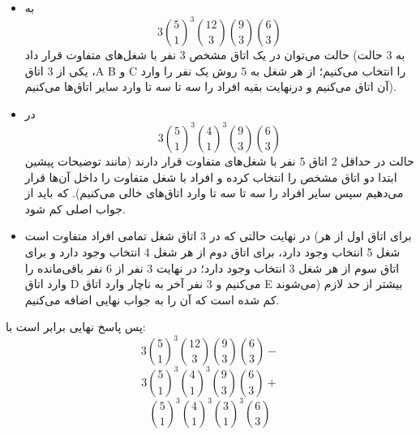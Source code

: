 \p
\begin{itemize}
    \item 
    به
    $$3\binom{5}{1}^3\binom{12}{3}\binom{9}{3}\binom{6}{3}$$
    حالت می‌توان در یک اتاق مشخص 3 نفر با شغل‌های متفاوت قرار داد (به 3 حالت یکی از 3 اتاق  ،A B و C را انتخاب می‌کنیم؛ از هر شغل به 5 روش یک نفر را وارد آن اتاق می‌کنیم و در‌نهایت بقیه افراد را سه تا سه تا وارد سایر اتاق‌ها می‌کنیم).

    \item
    در
    $$3\binom{5}{1}^3\binom{4}{1}^3\binom{9}{3}\binom{6}{3}$$
    حالت در حداقل 2 اتاق 5 نفر با شغل‌های متفاوت قرار دارند (مانند توضیحات پیشین ابتدا دو اتاق مشخص را انتخاب کرده و افراد با شغل متفاوت را داخل آن‌ها قرار می‌دهیم سپس سایر افراد را سه تا سه تا وارد اتاق‌های خالی می‌کنیم). که باید از جواب اصلی کم شود.
    
    \item
    در نهایت حالتی که در 3 اتاق شغل تمامی افراد متفاوت است (برای اتاق اول از هر شغل 5 انتخاب وجود دارد، برای اتاق دوم از هر شغل 4 انتخاب وجود دارد و برای اتاق سوم از هر شغل 3 انتخاب وجود دارد؛ در نهایت 3 نفر از 6 نفر باقی‌مانده را وارد اتاق D می‌کنیم و 3 نفر آخر به ناچار وارد اتاق E می‌شوند) بیشتر از حد لازم کم شده است که آن را به جواب نهایی اضافه می‌کنیم.
\end{itemize}
    پس پاسخ نهایی برابر است با:
    $$3\binom{5}{1}^3\binom{12}{3}\binom{9}{3}\binom{6}{3}-$$
    $$3\binom{5}{1}^3\binom{4}{1}^3\binom{9}{3}\binom{6}{3}+$$
    $$\binom{5}{1}^3\binom{4}{1}^3\binom{3}{1}^3\binom{6}{3}$$
